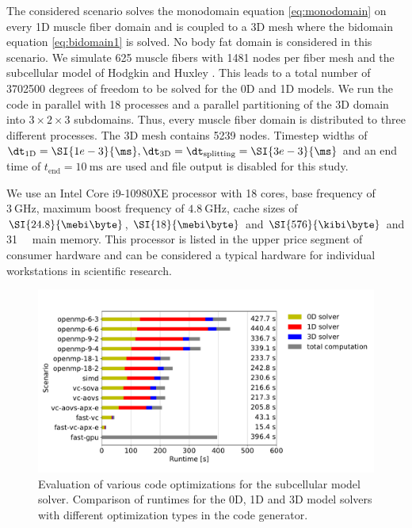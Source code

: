 The considered scenario solves the monodomain equation \cref{eq:monodomain} on every 1D muscle fiber domain and is coupled to a 3D mesh where the bidomain equation \cref{eq:bidomain1} is solved. No body fat domain is considered in this scenario.
We simulate 625 muscle fibers with 1481 nodes per fiber mesh and the subcellular model of Hodgkin and Huxley \cite{Hodgkin1952}. This leads to a total number of \num{3702500} degrees of freedom to be solved for the 0D and 1D models.
We run the code in parallel with 18 processes and a parallel partitioning of the 3D domain into $3 \times 2 \times 3$ subdomains. Thus, every muscle fiber domain is distributed to three different processes.
The 3D mesh contains 5239 nodes. Timestep widths of $\dt_\text{1D} = \SI{1e-3}{\ms}, \dt_\text{3D} = \dt_\text{splitting} = \SI{3e-3}{\ms}$ and an end time of $t_\text{end} = \SI{10}{\ms}$ are used and file output is disabled for this study.

We use an Intel Core i9-10980XE processor with 18 cores, base frequency of $\SI{3}{\giga\hertz}$, maximum boost frequency of $\SI{4.8}{\giga\hertz}$, cache sizes of 
$\SI{24.8}{\mebi\byte}$, $\SI{18}{\mebi\byte}$ and $\SI{576}{\kibi\byte}$ and \SI{31}{\gibi\byte} main memory. This processor is listed in the upper price segment of consumer hardware and can be considered a typical hardware for individual workstations in scientific research.

\begin{figure}
  \centering%
  \includegraphics[width=\textwidth]{images/results/studies/fibers_emg_study.pdf}%
  \caption{Evaluation of various code optimizations for the subcellular model solver. Comparison of runtimes for the 0D, 1D and 3D model solvers with different optimization types in the code generator.}%
  \label{fig:fibers_emg_study}%
\end{figure}%

